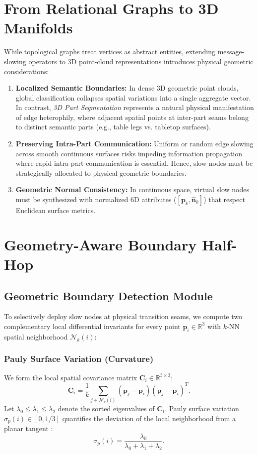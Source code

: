 \documentclass[journal]{IEEEtran}
\begin{document}
\section{From Relational Graphs to 3D Manifolds}
While topological graphs treat vertices as abstract entities, extending message-slowing operators to 3D point-cloud representations introduces physical geometric considerations:
\begin{enumerate}
    \item \textbf{Localized Semantic Boundaries:} In dense 3D geometric point clouds, global classification collapses spatial variations into a single aggregate vector. In contrast, \textit{3D Part Segmentation} represents a natural physical manifestation of edge heterophily, where adjacent spatial points at inter-part seams belong to distinct semantic parts (e.g., table legs vs. tabletop surfaces).
    \item \textbf{Preserving Intra-Part Communication:} Uniform or random edge slowing across smooth continuous surfaces risks impeding information propagation where rapid intra-part communication is essential. Hence, slow nodes must be strategically allocated to physical geometric boundaries.
    \item \textbf{Geometric Normal Consistency:} In continuous space, virtual slow nodes must be synthesized with normalized 6D attributes ($[\mathbf{p}_k, \hat{\mathbf{n}}_k]$) that respect Euclidean surface metrics.
\end{enumerate}

\section{Geometry-Aware Boundary Half-Hop}

\subsection{Geometric Boundary Detection Module}
To selectively deploy slow nodes at physical transition seams, we compute two complementary local differential invariants for every point $\mathbf{p}_i \in \mathbb{R}^3$ with $k$-NN spatial neighborhood $\mathcal{N}_k(i)$:

\subsubsection{Pauly Surface Variation (Curvature)}
We form the local spatial covariance matrix $\mathbf{C}_i \in \mathbb{R}^{3 \times 3}$:
\begin{equation}
\mathbf{C}_i = \frac{1}{k} \sum_{j \in \mathcal{N}_k(i)} (\mathbf{p}_j - \mathbf{p}_i)(\mathbf{p}_j - \mathbf{p}_i)^T.
\label{eq:cov}
\end{equation}
Let $\lambda_0 \le \lambda_1 \le \lambda_2$ denote the sorted eigenvalues of $\mathbf{C}_i$. Pauly surface variation $\sigma_p(i) \in [0, 1/3]$ quantifies the deviation of the local neighborhood from a planar tangent \cite{pauly}:
\begin{equation}
\sigma_p(i) = \frac{\lambda_0}{\lambda_0 + \lambda_1 + \lambda_2}.
\label{eq:pauly}
\end{equation}
\end{document}
